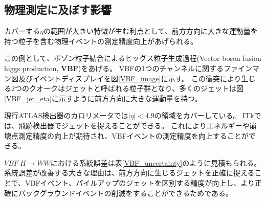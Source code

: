 \clearpage
\subsection{物理測定に及ぼす影響}
カバーする$\eta$の範囲が大きい特徴が生む利点として、前方方向に大きな運動量を持つ粒子を含む物理イベントの測定精度向上があげられる。

この例として、ボゾン粒子結合によるヒッグス粒子生成過程(Vector boson fusion higgs production, \textbf{VBF})をあげる。
VBFの1つのチャンネルに関するファインマン図及びイベントディスプレイを図\ref{VBF_image}に示す。
この衝突により生じる2つのクオークはジェットと呼ばれる粒子群となり、多くのジェットは図\ref{VBF_jet_eta}に示すように前方方向に大きな運動量を持つ。

現行ATLAS検出器のカロリメータでは$|\eta|<4.9$の領域をカバーしている。
ITkでは、飛跡検出器でジェットを捉えることができる。
これによりエネルギーや崩壊点測定精度の向上が期待され、VBFイベントの測定精度を向上することができる。

$VBF~H\rightarrow WW$における系統誤差は表\ref{VBF_uncertainty}のように見積もられる\cite{1-3}。
系統誤差が改善する大きな理由は、前方方向に生じるジェットを正確に捉えることで、VBFイベント、パイルアップのジェットを区別する精度が向上し、より正確にバックグラウンドイベントの削減をすることができるためである。

